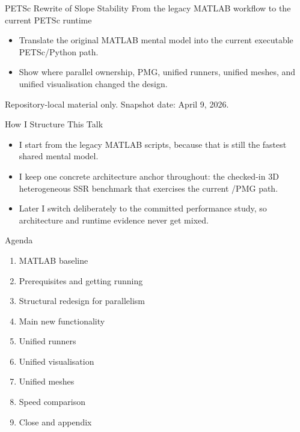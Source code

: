\documentclass[aspectratio=169,10pt]{beamer}
\begin{document}
\TitleFrame
  {PETSc Rewrite of Slope Stability}
  {From the legacy MATLAB workflow to the current PETSc runtime}
  {
    \begin{itemize}
      \item Translate the original MATLAB mental model into the current executable PETSc/Python path.
      \item Show where parallel ownership, PMG, unified runners, unified meshes, and unified visualisation changed the design.
    \end{itemize}
  }
  {Repository-local material only. Snapshot date: April 9, 2026.}

\begin{frame}{How I Structure This Talk}
\small
\begin{softbox}
\begin{itemize}
  \item I start from the legacy MATLAB scripts, because that is still the fastest shared mental model.
  \item I keep one concrete architecture anchor throughout: the checked-in 3D heterogeneous SSR benchmark that exercises the current /PMG path.
  \item Later I switch deliberately to the committed  performance study, so architecture and runtime evidence never get mixed.
\end{itemize}
\end{softbox}
\end{frame}

\begin{frame}{Agenda}
\small
\begin{softbox}
\begin{enumerate}
  \item MATLAB baseline
  \item Prerequisites and getting running
  \item Structural redesign for parallelism
  \item Main new functionality
  \item Unified runners
  \item Unified visualisation
  \item Unified meshes
  \item Speed comparison
  \item Close and appendix
\end{enumerate}
\end{softbox}
\end{frame}
\end{document}
